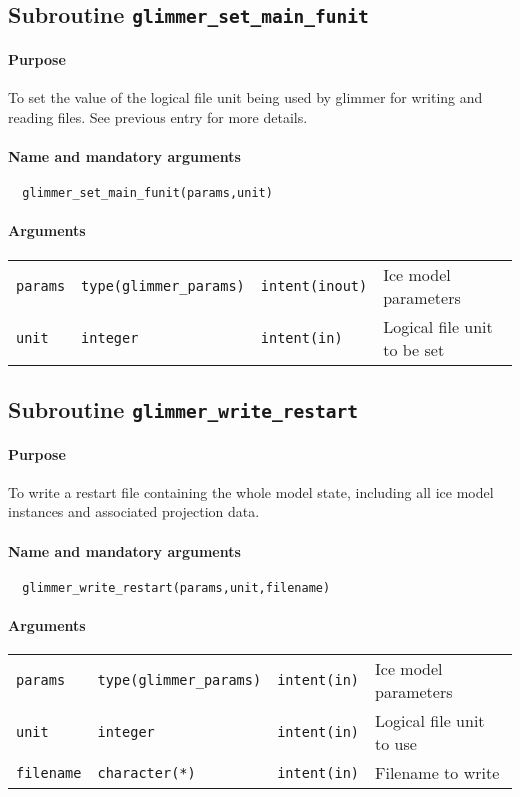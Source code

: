 \documentclass[11pt]{article}
\begin{document}
\subsection{Subroutine \texttt{glimmer\_set\_main\_funit}}
%
\paragraph{Purpose}
%
To set the value of the logical file unit being used by glimmer for writing
and reading files. See previous entry for more details.
%
\paragraph{Name and mandatory arguments}
%
\begin{verbatim}
  glimmer_set_main_funit(params,unit)
\end{verbatim}
%
\paragraph{Arguments}
%
\begin{center}
\begin{tabular}{llll}
\texttt{params} & \texttt{type(glimmer\_params)} & \texttt{intent(inout)} &
Ice model parameters \\
\texttt{unit} & \texttt{integer} & \texttt{intent(in)} & Logical file unit to
be set \\
\end{tabular}
\end{center}
%
\subsection{Subroutine \texttt{glimmer\_write\_restart}}
%
\paragraph{Purpose}
%
To write a restart file containing the whole model state, including all ice
model instances and associated projection data.
%
\paragraph{Name and mandatory arguments}
%
\begin{verbatim}
  glimmer_write_restart(params,unit,filename)
\end{verbatim}
%
\paragraph{Arguments}
%
\begin{center}
\begin{tabular}{llll}
\texttt{params} & \texttt{type(glimmer\_params)} & \texttt{intent(in)} &
Ice model parameters \\
\texttt{unit} & \texttt{integer} & \texttt{intent(in)} & Logical file unit to
use \\
\texttt{filename} & \texttt{character(*)} & \texttt{intent(in)} & Filename to
write \\
\end{tabular}
\end{center}
%
\end{document}
